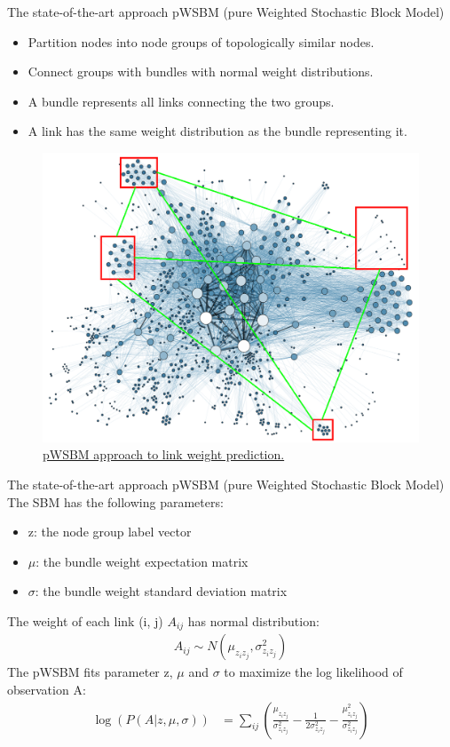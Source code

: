 \documentclass{beamer}
\begin{document}
\begin{frame}{The state-of-the-art approach} {pWSBM (pure Weighted Stochastic Block Model)}
	\begin{itemize}
		\item Partition nodes into node groups of topologically similar nodes.
		\item Connect groups with bundles with normal weight distributions.
		\item A bundle represents all links connecting the two groups.
		\item A link has the same weight distribution as the bundle representing it.
	\end{itemize}
	\begin{figure}[H]
		\centering
		\includegraphics[width=0.4\linewidth]{SBM}
		\caption{ \href{https://commons.wikimedia.org/wiki/File:Social_Network_Analysis_Visualization.png}{pWSBM approach to link weight prediction.}}
		\label{fig:SBM}
	\end{figure}
\end{frame}

\begin{frame}{The state-of-the-art approach} {pWSBM (pure Weighted Stochastic Block Model)}
	The SBM has the following parameters:
	\begin{itemize}
		\item z: the node group label vector
		\item $ \mu $: the bundle weight expectation matrix
		\item $ \sigma $: the bundle weight standard deviation matrix
	\end{itemize}
	The weight of each link (i, j) $ A_{ij} $ has normal distribution:
	\begin{align*}
		A_{ij} \sim N(\mu_{z_i z_j}, \sigma_{z_i z_j}^2)
	\end{align*}
	The pWSBM fits parameter z, $ \mu $ and $ \sigma $
	to maximize the log likelihood of observation A:
	\begin{align*}
		\log(P(A|z, \mu, \sigma))
		&= \sum_{ij} (
		\frac{\mu_{z_i z_j}}{\sigma_{z_i z_j}^2}
		- \frac{1}{2\sigma_{z_i z_j}^2}
		- \frac{\mu_{z_i z_j}^2}{\sigma_{z_i z_j}^2}
		)
	\end{align*}
\end{frame}
\end{document}
